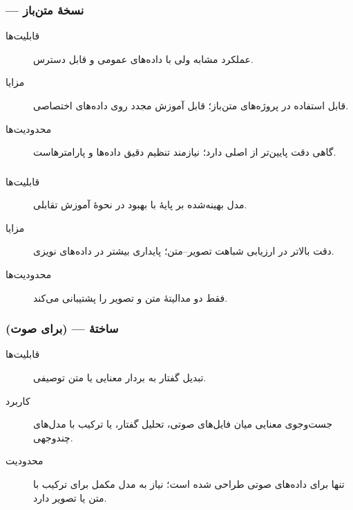 \documentclass{article}
\begin{document}
\subsubsection{ — نسخهٔ متن‌باز }

\begin{description}
\item[قابلیت‌ها] عملکرد مشابه  ولی با داده‌های عمومی و قابل دسترس.

\item[مزایا] قابل استفاده در پروژه‌های متن‌باز؛ قابل آموزش مجدد روی داده‌های اختصاصی.

\item[محدودیت‌ها] گاهی دقت پایین‌تر از  اصلی دارد؛ نیازمند تنظیم دقیق داده‌ها و پارامترهاست.
\end{description}

\subsubsection{}

\begin{description}
\item[قابلیت‌ها] مدل بهینه‌شده بر پایهٔ  با بهبود در نحوهٔ آموزش تقابلی.

\item[مزایا] دقت بالاتر در ارزیابی شباهت تصویر–متن؛ پایداری بیشتر در داده‌های نویزی.

\item[محدودیت‌ها] فقط دو مدالیتهٔ متن و تصویر را پشتیبانی می‌کند.
\end{description}

\subsubsection{ (برای صوت) — ساختهٔ }

\begin{description}
\item[قابلیت‌ها] تبدیل گفتار به بردار معنایی یا متن توصیفی.

\item[کاربرد] جست‌وجوی معنایی میان فایل‌های صوتی، تحلیل گفتار، یا ترکیب با مدل‌های چندوجهی.

\item[محدودیت] تنها برای داده‌های صوتی طراحی شده است؛ نیاز به مدل مکمل برای ترکیب با متن یا تصویر دارد.

\end{description}
\end{document}

